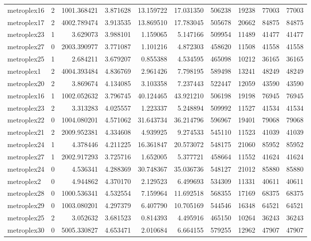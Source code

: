 \begin{longtable}{|l|r|r|r|r|r|r|r|r|r|}
metroplex16 & 2 & 1001.368421 & 3.871628 & 13.159722 & 17.031350 & 506238 & 19238 & 77003 & 77003 \\
metroplex17 & 2 & 4002.789474 & 3.913535 & 13.869510 & 17.783045 & 505678 & 20662 & 84875 & 84875 \\
metroplex23 & 1 & 3.629073 & 3.988101 & 1.159065 & 5.147166 & 509954 & 11489 & 41477 & 41477 \\
metroplex27 & 0 & 2003.390977 & 3.771087 & 1.101216 & 4.872303 & 458620 & 11508 & 41558 & 41558 \\
metroplex25 & 1 & 2.684211 & 3.679207 & 0.855388 & 4.534595 & 465098 & 10212 & 36165 & 36165 \\
metroplex1 & 2 & 4004.393484 & 4.836769 & 2.961426 & 7.798195 & 589498 & 13241 & 48249 & 48249 \\
metroplex20 & 2 & 3.869674 & 4.134085 & 3.103358 & 7.237443 & 522447 & 12059 & 43590 & 43590 \\
metroplex16 & 1 & 1002.052632 & 3.796745 & 40.124465 & 43.921210 & 506198 & 19198 & 76945 & 76945 \\
metroplex23 & 2 & 3.313283 & 4.025557 & 1.223337 & 5.248894 & 509992 & 11527 & 41534 & 41534 \\
metroplex22 & 0 & 1004.080201 & 4.571062 & 31.643734 & 36.214796 & 596967 & 19401 & 79068 & 79068 \\
metroplex21 & 2 & 2009.952381 & 4.334608 & 4.939925 & 9.274533 & 545110 & 11523 & 41039 & 41039 \\
metroplex24 & 1 & 4.378446 & 4.211225 & 16.361847 & 20.573072 & 548175 & 21060 & 85952 & 85952 \\
metroplex27 & 1 & 2002.917293 & 3.725716 & 1.652005 & 5.377721 & 458664 & 11552 & 41624 & 41624 \\
metroplex24 & 0 & 4.536341 & 4.288369 & 30.748367 & 35.036736 & 548127 & 21012 & 85880 & 85880 \\
metroplex2 & 0 & 4.944862 & 4.370170 & 2.129523 & 6.499693 & 534309 & 11331 & 40611 & 40611 \\
metroplex28 & 0 & 1000.536341 & 4.532554 & 7.159964 & 11.692518 & 568355 & 17169 & 68375 & 68375 \\
metroplex29 & 0 & 1003.080201 & 4.297379 & 6.407790 & 10.705169 & 544546 & 16348 & 64521 & 64521 \\
metroplex25 & 2 & 3.052632 & 3.681523 & 0.814393 & 4.495916 & 465150 & 10264 & 36243 & 36243 \\
metroplex30 & 0 & 5005.330827 & 4.653471 & 2.010684 & 6.664155 & 579255 & 12962 & 47907 & 47907 \\

\end{longtable}
